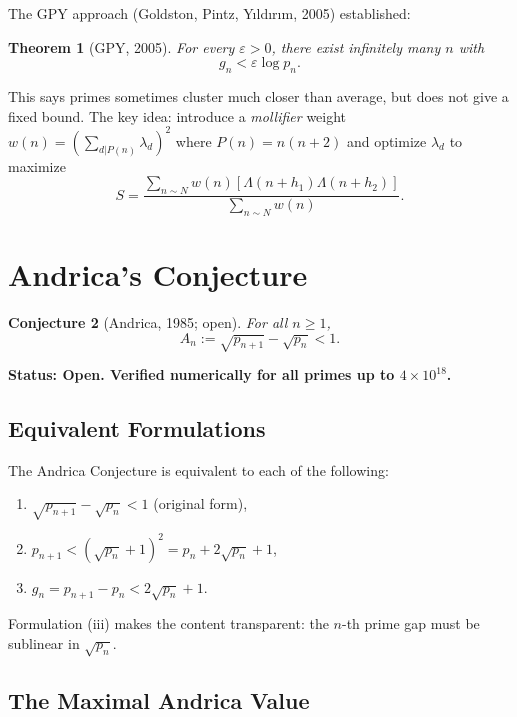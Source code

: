 \documentclass[12pt,a4paper]{amsart}
\newtheorem{theorem}{Theorem}[section]
\newtheorem{conjecture}[theorem]{Conjecture}
\theoremstyle{definition}
\begin{document}
The GPY approach (Goldston, Pintz, Y{\i}ld{\i}r{\i}m, 2005) established:
\begin{theorem}[GPY, 2005]
For every $\varepsilon > 0$, there exist infinitely many $n$ with
\[
  g_n < \varepsilon \log p_n.
\]
\end{theorem}

This says primes sometimes cluster much closer than average, but does not give a
fixed bound. The key idea: introduce a \emph{mollifier} weight $w(n) = (\sum_{d |
P(n)} \lambda_d)^2$ where $P(n) = n(n+2)$ and optimize $\lambda_d$ to maximize
\[
  S = \frac{\sum_{n \sim N} w(n)[\Lambda(n+h_1)\Lambda(n+h_2)]}{\sum_{n \sim N} w(n)}.
\]

\section{Andrica's Conjecture}

\begin{conjecture}[Andrica, 1985; open]
\label{conj:andrica}
For all $n \geq 1$,
\[
  A_n := \sqrt{p_{n+1}} - \sqrt{p_n} < 1.
\]
\end{conjecture}

\textbf{Status: Open. Verified numerically for all primes up to $4 \times
10^{18}$.}

\subsection{Equivalent Formulations}

The Andrica Conjecture is equivalent to each of the following:
\begin{enumerate}[label=(\roman*)]
  \item $\sqrt{p_{n+1}} - \sqrt{p_n} < 1$ (original form),
  \item $p_{n+1} < (\sqrt{p_n} + 1)^2 = p_n + 2\sqrt{p_n} + 1$,
  \item $g_n = p_{n+1} - p_n < 2\sqrt{p_n} + 1$.
\end{enumerate}

Formulation (iii) makes the content transparent: the $n$-th prime gap must be
sublinear in $\sqrt{p_n}$.

\subsection{The Maximal Andrica Value}
\end{document}
